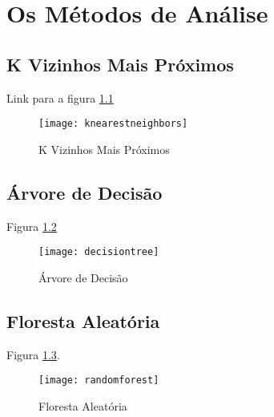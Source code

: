 \chapter{Os Métodos de Análise}
\label{chapter:os_metodos_de_analise}

\section{\textbf{K Vizinhos Mais Próximos}}

Link para a figura \ref{fig:knearestneighbors}

\begin{figure}[!htb]
\begin{center}
\caption{K Vizinhos Mais Próximos}
\texttt{[image: knearestneighbors]}
\label{fig:knearestneighbors}
\end{center}
\end{figure}

\section{\textbf{Árvore de Decisão}}

Figura \ref{fig:decisiontree}

\begin{figure}[!htb]
\begin{center}
\caption{Árvore de Decisão}
\texttt{[image: decisiontree]}
\label{fig:decisiontree}
\end{center}
\end{figure}


\section{\textbf{Floresta Aleatória}}

Figura \ref{fig:randomforest}.


\begin{figure}[!htb]
\begin{center}
\caption{Floresta Aleatória}
\texttt{[image: randomforest]}
\label{fig:randomforest}
\end{center}
\end{figure}


